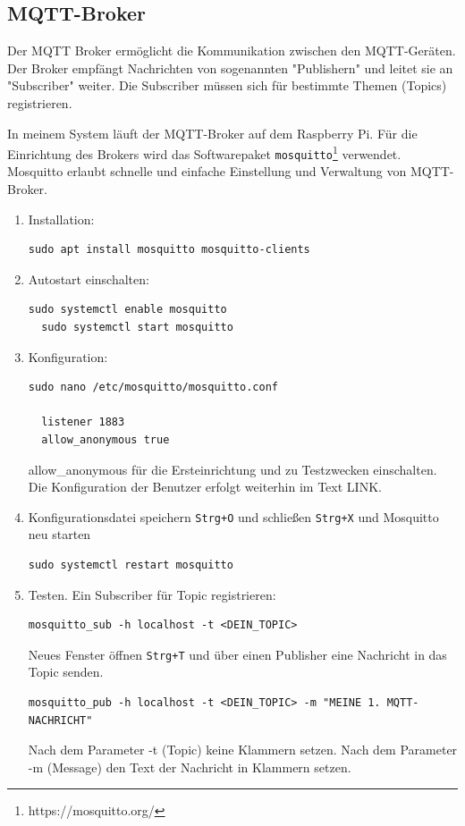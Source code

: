 \documentclass[12pt, letterpaper]{article}
\begin{document}
\subsection{MQTT-Broker}
\par Der MQTT Broker ermöglicht die Kommunikation zwischen den MQTT-Geräten. Der Broker empfängt Nachrichten von sogenannten "Publishern" und leitet sie an "Subscriber" weiter. Die Subscriber müssen sich für bestimmte Themen (Topics) registrieren.
\par In meinem System läuft der MQTT-Broker auf dem Raspberry Pi. Für die Einrichtung des Brokers wird das Softwarepaket \texttt{mosquitto}\footnote[99]{https://mosquitto.org/} verwendet. Mosquitto erlaubt schnelle und einfache Einstellung und Verwaltung von MQTT-Broker. 
\par 
\begin{enumerate}
  \item Installation:
\begin{Verbatim}[frame=single]
  sudo apt install mosquitto mosquitto-clients
\end{Verbatim}
\item Autostart einschalten:
\begin{Verbatim}[frame=single]
  sudo systemctl enable mosquitto
  sudo systemctl start mosquitto
\end{Verbatim}
\item Konfiguration:
\begin{Verbatim}[frame=single]
  sudo nano /etc/mosquitto/mosquitto.conf

  listener 1883
  allow_anonymous true
\end{Verbatim}
\par allow\_anonymous für die Ersteinrichtung und zu Testzwecken einschalten. Die Konfiguration der Benutzer erfolgt weiterhin im Text LINK.
\item Konfigurationsdatei speichern \texttt{Strg+O} und schließen \texttt{Strg+X} und Mosquitto neu starten 
\begin{Verbatim}[frame=single]
  sudo systemctl restart mosquitto
\end{Verbatim}
  \item Testen. Ein Subscriber für Topic registrieren: 
\begin{Verbatim}[frame=single]
  mosquitto_sub -h localhost -t <DEIN_TOPIC>
\end{Verbatim}
\par Neues Fenster öffnen \texttt{Strg+T} und über einen Publisher eine Nachricht in das Topic senden.
\begin{Verbatim}[frame=single]
  mosquitto_pub -h localhost -t <DEIN_TOPIC> -m "MEINE 1. MQTT-NACHRICHT"
\end{Verbatim}
\par Nach dem Parameter -t (Topic) keine Klammern setzen. Nach dem Parameter -m (Message) den Text der Nachricht in Klammern setzen.
\end{enumerate}
\end{document}
